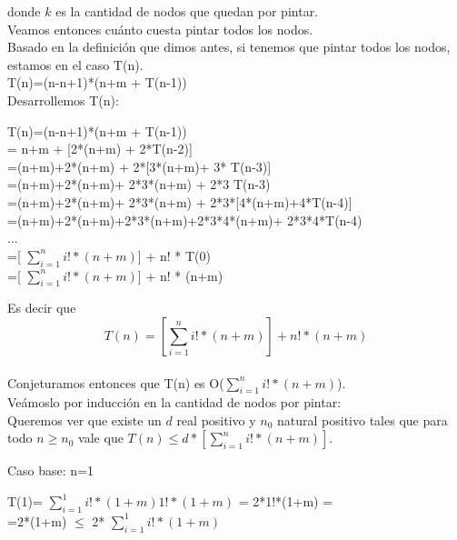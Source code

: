 donde $k$ es la cantidad de nodos que quedan por pintar.\\


\indent Veamos entonces cuánto cuesta pintar todos los nodos.\\
\indent Basado en la definición que dimos antes, si tenemos que pintar todos los nodos, estamos en el caso T(n).\\

\indent T(n)=(n-n+1)*(n+m + T(n-1))\\

\indent Desarrollemos T(n):\\


\begin{centering}
T(n)=(n-n+1)*(n+m + T(n-1))\\
= n+m + [2*(n+m) + 2*T(n-2)]\\
=(n+m)+2*(n+m) + 2*[3*(n+m)+ 3* T(n-3)]\\
=(n+m)+2*(n+m)+ 2*3*(n+m) + 2*3 T(n-3)\\
=(n+m)+2*(n+m)+ 2*3*(n+m) + 2*3*[4*(n+m)+4*T(n-4)]\\
=(n+m)+2*(n+m)+2*3*(n+m)+2*3*4*(n+m)+ 2*3*4*T(n-4)\\
...\\
=[ $\sum_{i=1}^{n} i! * (n+m) $] + n! * T(0) \\
=[ $\sum_{i=1}^{n} i! * (n+m) $] + n! * (n+m)\\
\end{centering}

\indent Es decir que $$T(n)= \left[ \sum_{i=1}^{n} i! * (n+m) \right] + n! * (n+m)$$\\

\indent Conjeturamos entonces que T(n) es O($\sum_{i=1}^{n} i! * (n+m) $).\\

\indent Veámoslo por inducción en la cantidad de nodos por pintar:\\

\indent Queremos ver que existe un $d$ real positivo y $n_{0}$ natural positivo tales que para todo $n\geq n_{0}$ vale que $T(n) \leq d * [\sum_{i=1}^{n} i! * (n+m)] $.

\indent Caso base: n=1 \\

\begin{center}
T(1)= $\sum_{i=1}^{1} i! * (1+m)  1! * (1+m) $ = 2*1!*(1+m) =\\
=2*(1+m) $\leq$ 2*  $\sum_{i=1}^{1} i! * (1+m)$ \\
\end{center}


